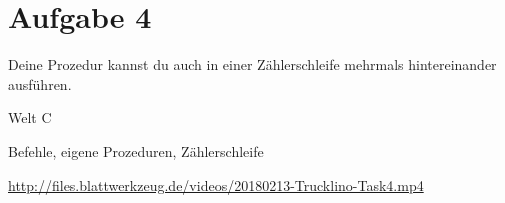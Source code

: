 \pagebreak

\section*{Aufgabe 4}
\label{sec:exercises:4}

Deine Prozedur kannst du auch in einer Zählerschleife mehrmals hintereinander ausführen.

\begin{description}[noitemsep]
  \item[Welt wählen:] Welt C
  \item[Du brauchst:] Befehle, eigene Prozeduren, Zählerschleife
  \item[Video:] \url{http://files.blattwerkzeug.de/videos/20180213-Trucklino-Task4.mp4}
\end{description}

